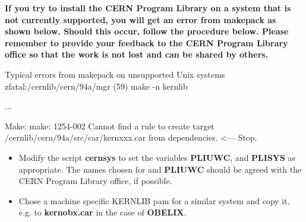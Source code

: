 
{\bf If you try to install the CERN Program Library on a system
that is not currently supported, you will get an error from
makepack as shown below. Should this occur, follow the procedure
below. Please remember to provide your feedback to the CERN Program
Library office so that the work is not lost and can be shared by
others.}

\begin{XMPt}{Typical errors from makepack on unsupported Unix systems}
zfatal:/cernlib/cern/94a/mgr (59) make -n kernlib  

...

Make: make: 1254-002 Cannot find a rule to create target 
     /cernlib/cern/94a/src/car/kernxxx.car from dependencies.   <---
   Stop.
\end{XMPt}

\begin{itemize}
\item
Modify the script {\bf cernsys} to set the variables {\bf PLIUWC},
\PLINAME{} and {\bf PLISYS} as appropriate. The names
chosen for \PLINAME{} and {\bf PLIUWC} should be agreed
with the CERN Program Library office, if possible.
\item
Chose a machine specific KERNLIB pam for a similar system and copy it, e.g.
to {\bf kernobx.car} in the case of {\bf OBELIX}.
\end{itemize}
